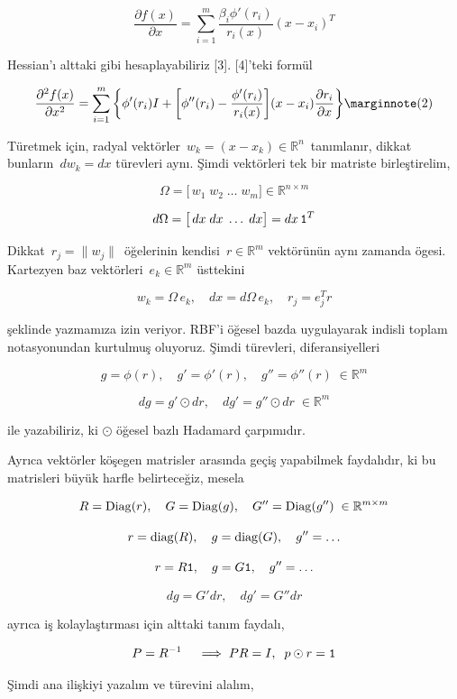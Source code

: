 \documentclass[12pt,fleqn]{article}\usepackage{../../common}
\begin{document}
$$
\frac{\partial f(x)}{\partial x} = \sum_{i=1}^{m} \frac{\beta_i\phi'(r_i)}{r_i(x)}
(x-x_i)^T
$$

Hessian'ı alttaki gibi hesaplayabiliriz [3]. [4]'teki formül

$$
\frac{\partial^2 f(x)}{\partial x^2} = 
\sum_{i=1}^{m} \bigg\{ 
\phi'(r_i) I + \bigg[\phi''(r_i) - \frac{\phi'(r_i)}{r_i(x)} \bigg] 
(x-x_i) \frac{\partial r_i}{\partial x}
\bigg\}
\mlabel{2}
$$

Türetmek için, radyal vektörler $\,w_k = (x - x_k)\in{\mathbb R}^n\,$
tanımlanır, dikkat bunların $\,dw_k = dx$ türevleri aynı. Şimdi vektörleri
tek bir matriste birleştirelim,

$$
\Omega = \big[\,w_1\;w_2\;\ldots\;w_m\big] \in {\mathbb R}^{n\times m} 
$$

$$
d\Omega = \big[\,dx\;dx\;\ldots\;dx\big] =  dx\,{\tt\large 1}^T 
$$

Dikkat $\,r_j=\|w_j\|\,$ öğelerinin kendisi $\,r\in{\mathbb R}^m$
vektörünün aynı zamanda ögesi.  Kartezyen baz vektörleri
$\,e_k\in{\mathbb R}^m$ üsttekini

$$w_k=\Omega\,e_k,\quad dx=d\Omega\,e_k,\quad r_j=e_j^Tr$$

şeklinde yazmamıza izin veriyor. RBF'i öğesel bazda uygulayarak indisli
toplam notasyonundan kurtulmuş oluyoruz. Şimdi türevleri, diferansiyelleri 

$$
g=\phi(r),\quad g'=\phi'(r),\quad g''=\phi''(r)\; \in{\mathbb R}^m 
$$

$$
dg=g'\odot dr,\quad dg'=g''\odot dr \; \in{\mathbb R}^m 
$$

ile yazabiliriz, ki $\odot$ öğesel bazlı Hadamard çarpımıdır.

Ayrıca vektörler köşegen matrisler arasında geçiş yapabilmek faydalıdır, ki
bu matrisleri büyük harfle belirteceğiz, mesela

$$
 R={\rm Diag}(r),\quad G=
{\rm Diag}(g),\quad G''={\rm Diag}(g'')\;\in{\mathbb R}^{m\times m} 
$$

$$
r = {\rm diag}(R),\quad g = {\rm diag}(G),\quad g''=\ldots 
$$

$$
r  = R{\tt\large 1},\quad g = G{\tt\large 1},\quad g''=\ldots 
$$

$$
dg = G'dr,\quad dg' = G''dr 
$$

ayrıca iş kolaylaştırması için alttaki tanım faydalı,

$$
P=R^{-1}\quad\implies PR=I,\;\;p\odot r = {\tt\large 1}
$$

Şimdi ana ilişkiyi yazalım ve türevini alalım,
\end{document}
